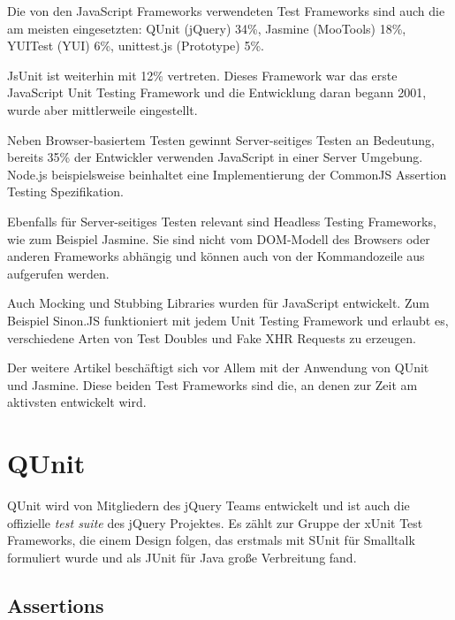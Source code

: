 \documentclass[11pt, a4paper]{article}
\begin{document}
Die von den JavaScript Frameworks verwendeten Test Frameworks sind auch die
am meisten eingesetzten: QUnit\cite{zaefferer_qunit_2011} (jQuery) 34\%,
Jasmine\cite{jasmine_jasmine_2011} (MooTools) 18\%,
YUITest\cite{yahoo_inc._yui_2011} (YUI) 6\%,
unittest.js\cite{fuchs_unittest.js_2011} (Prototype) 5\%.

JsUnit\cite{jsunit_jsunit_2011} ist weiterhin mit 12\% vertreten. Dieses
Framework war das erste JavaScript Unit Testing Framework und die Entwicklung
daran begann 2001, wurde aber mittlerweile eingestellt.

Neben Browser-basiertem Testen gewinnt Server-seitiges Testen an Bedeutung,
bereits 35\% der Entwickler verwenden JavaScript in einer Server Umgebung.
Node.js beispielsweise beinhaltet eine Implementierung der CommonJS Assertion Testing
Spezifikation\cite{node.js_node.js_2011}.

Ebenfalls für Server-seitiges Testen relevant sind Headless Testing Frameworks,
wie zum Beispiel Jasmine. Sie sind nicht vom DOM-Modell des Browsers oder
anderen Frameworks abhängig und können auch von der Kommandozeile aus aufgerufen
werden.

Auch Mocking und Stubbing Libraries wurden für JavaScript entwickelt.
Zum Beispiel Sinon.JS\cite{johansen_sinon.js_2011} funktioniert mit jedem Unit
Testing Framework und erlaubt es, verschiedene Arten von Test Doubles und Fake
XHR Requests zu erzeugen.

Der weitere Artikel beschäftigt sich vor Allem mit der Anwendung von QUnit und
Jasmine. Diese beiden Test Frameworks sind die, an denen zur Zeit am
aktivsten entwickelt wird.

\clearpage

\section{QUnit}

QUnit\cite{zaefferer_qunit_2011} wird von Mitgliedern des jQuery
Teams\cite{resig_jquery_2011} entwickelt und ist auch die offizielle
\emph{test suite} des jQuery Projektes. Es zählt zur Gruppe der
xUnit Test Frameworks\cite{fowler_xunit_2010}, die einem Design folgen,
das erstmals mit SUnit\cite{beck_simple_1994} für Smalltalk formuliert
wurde und als JUnit\cite{gamma_junit_2011} für Java große Verbreitung fand.

\subsection{Assertions}
\end{document}
